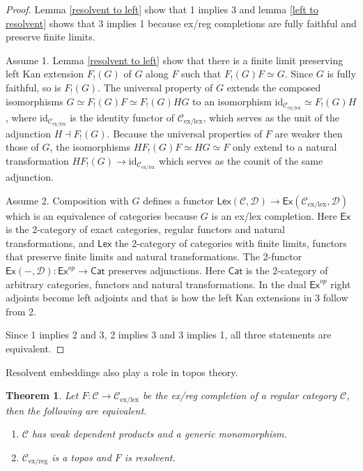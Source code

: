 \documentclass[sort&compress,draft]{elsarticle}
\theoremstyle{plain}
\newtheorem{theorem}{Theorem}
\theoremstyle{definition}
\theoremstyle{remark}
\newcommand\hide[1]{}
\newcommand\cat\mathcal
\newcommand\exlex{_\mathrm{ex/lex}}\newcommand\exreg{_\mathrm{ex/reg}}
\newcommand\of:
\newcommand\id{\mathrm{id}}
\newcommand\di{_!}
\begin{document}
\newcommand\Cat\mathsf
\newcommand\dual{^{op}}
\begin{proof} 
Lemma \ref{resolvent to left} show that 1 implies 3 and lemma \ref{left to resolvent} shows that 3 implies 1 because ex/reg completions are fully faithful and preserve finite limits.

Assume 1. Lemma \ref{resolvent to left} show that there is a finite limit preserving left Kan extension $F\di(G)$ of $G$ along $F$ such that $F\di(G)F\simeq G$. Since $G$ is fully faithful, so is $F\di(G)$. The universal property of $G$ extends the composed isomorphisms $G \simeq F\di(G)F\simeq F\di(G)HG$ to an isomorphism $\id_{\cat C\exlex}\simeq F\di(G)H$, where $\id_{\cat C\exlex}$ is the identity functor of $\cat C\exlex$, which serves as the unit of the adjunction $H \dashv F\di(G)$. Because the universal properties of $F$ are weaker then those of $G$, the isomorphisms $HF\di(G)F\simeq HG\simeq F$ only extend to a natural transformation $HF\di(G)\to \id_{\cat C\exlex}$ which serves as the counit of the same adjunction.

Assume 2. Composition with $G$ defines a functor $\Cat{Lex}(\cat C,\cat D)\to\Cat{Ex}(\cat C\exlex,\cat D)$ which is an equivalence of categories because $G$ is an ex/lex completion. Here $\Cat{Ex}$ is the 2-category of exact categories, regular functors and natural transformations, and $\Cat{Lex}$ the 2-category of categories with finite limits, functors that preserve finite limits and natural transformations. The 2-functor $\Cat{Ex}(-,\cat D)\of\Cat{Ex}\dual\to\Cat{Cat}$ preserves adjunctions. Here $\Cat{Cat}$ is the 2-category of arbitrary categories, functors and natural transformations. In the dual $\Cat{Ex}\dual$ right adjoints become left adjoints and that is how the left Kan extensions in 3 follow from 2.
\hide{Is this acceptable? Would it (not) be better to move everything to the 2-categorical level?}

Since 1 implies 2 and 3, 2 implies 3 and 3 implies 1, all three statements are equivalent.
\end{proof}

Resolvent embeddings also play a role in topos theory.

\begin{theorem} Let $F:\cat C\to\cat C\exlex$ be the ex/reg completion of a regular category $\cat C$, then the following are equivalent.
\begin{enumerate}
\item $\cat C$ has \emph{weak dependent products} and a \emph{generic monomorphism}. \hide{these need to be defined somewhere}
\item $\cat C\exreg$ is a topos and $F$ is resolvent. 
\end{enumerate}
\end{theorem}
\end{document}
